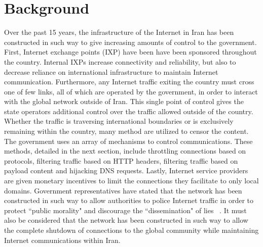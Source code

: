 \section{Background}\label{sec:background}

Over the past 15 years, the infrastructure of the Internet in Iran has been constructed in such way to give increasing amounts of control to the government. First, Internet exchange points (IXP) have been have been sponsored throughout the country. Internal IXPs increase connectivity and reliability, but also to decrease reliance on international infrastructure to maintain Internet communication. Furthermore, any Internet traffic exiting the country must cross one of few links, all of which are operated by the government, in order to interact with the global network outside of Iran. This single point of control gives the state operators additional control over the traffic allowed outside of the country. Whether the traffic is traversing international boundaries or is exclusively remaining within the country, many method are utilized to censor the content. \\
The government uses an array of mechanisms to control communications. These methods, detailed in the next section, include throttling connections based on protocols, filtering traffic based on HTTP headers, filtering traffic based on payload content and hijacking DNS requests. Lastly, Internet service providers are given monetary incentives to limit the connections they facilitate to only local domains. Government representatives have stated that the network has been constructed in such way to allow authorities to police Internet traffic in order to protect ``public morality" and discourage the ``dissemination" of lies ~\cite{anderson}. It must also be considered that the network has been constructed in such way to allow the complete shutdown of connections to the global community while maintaining Internet communications within Iran.
